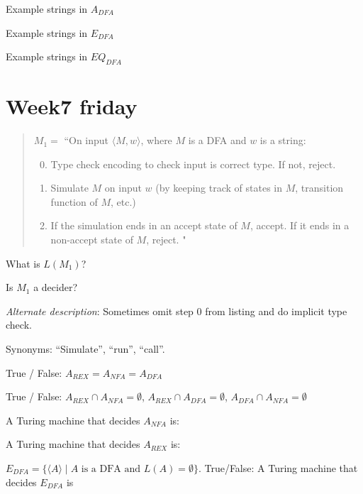 \documentclass[12pt, oneside]{article}
\begin{document}
    Example strings in $A_{DFA}$
    
    \vfill
    
    Example strings in  $E_{DFA}$
    
    \vfill
    
    Example strings in  $EQ_{DFA}$
    
    \vfill
 \vfill
\section*{Week7 friday}


  \begin{quote}
  $M_1 = $ ``On input $\langle M,w\rangle$, where $M$ is a DFA and $w$ is a string:
  \begin{enumerate}
  \setcounter{enumi}{-1}
  \item Type check encoding to check input is correct type. If not, reject.
  \item Simulate $M$ on input $w$ (by keeping track of states in $M$, transition function of $M$, etc.) 
  \item If the simulation ends in an accept state of $M$, accept. If it ends in a non-accept state of $M$, reject. "
  \end{enumerate}
  \end{quote}
  

What is $L(M_1)$? 

\vfill

Is $M_1$ a decider?

\vfill


{\it Alternate description}:
Sometimes omit step 0 from listing and do implicit type check.

Synonyms: ``Simulate'', ``run'', ``call''.

\newpage

  True / False: $A_{REX} = A_{NFA} = A_{DFA}$

  True / False: $A_{REX} \cap A_{NFA} = \emptyset$, $A_{REX} \cap A_{DFA} = \emptyset$, $A_{DFA} \cap A_{NFA} = \emptyset$

  
  A Turing machine that  decides $A_{NFA}$ is: 
  
  \vfill
  
  A Turing machine that  decides $A_{REX}$ is: 
  
  \vfill

  $E_{DFA} = \{ \langle A \rangle \mid  \text{$A$ is a  DFA and  $L(A) = \emptyset$}\}$. 
  True/False: A Turing machine that  decides $E_{DFA}$ is
\end{document}
